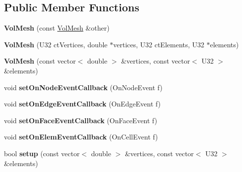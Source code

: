 \subsection*{Public Member Functions}
\begin{DoxyCompactItemize}
\item 
\hypertarget{classps_1_1elastic_1_1VolMesh_ae6c4090f52d629275bafec3b28b82a72}{}{\bfseries Vol\+Mesh} (const \hyperlink{classps_1_1elastic_1_1VolMesh}{Vol\+Mesh} \&other)\label{classps_1_1elastic_1_1VolMesh_ae6c4090f52d629275bafec3b28b82a72}

\item 
\hypertarget{classps_1_1elastic_1_1VolMesh_a47f2518a104c2fd21038fd6293c5df4b}{}{\bfseries Vol\+Mesh} (U32 ct\+Vertices, double $\ast$vertices, U32 ct\+Elements, U32 $\ast$elements)\label{classps_1_1elastic_1_1VolMesh_a47f2518a104c2fd21038fd6293c5df4b}

\item 
\hypertarget{classps_1_1elastic_1_1VolMesh_a5d354fc8ecc1cf49eaabf54d47ffaf4f}{}{\bfseries Vol\+Mesh} (const vector$<$ double $>$ \&vertices, const vector$<$ U32 $>$ \&elements)\label{classps_1_1elastic_1_1VolMesh_a5d354fc8ecc1cf49eaabf54d47ffaf4f}

\item 
\hypertarget{classps_1_1elastic_1_1VolMesh_ae7e26e6519d1e2db5d5bbf58cb402906}{}void {\bfseries set\+On\+Node\+Event\+Callback} (On\+Node\+Event f)\label{classps_1_1elastic_1_1VolMesh_ae7e26e6519d1e2db5d5bbf58cb402906}

\item 
\hypertarget{classps_1_1elastic_1_1VolMesh_a38dde82b129ee0361b07162da7f9b60b}{}void {\bfseries set\+On\+Edge\+Event\+Callback} (On\+Edge\+Event f)\label{classps_1_1elastic_1_1VolMesh_a38dde82b129ee0361b07162da7f9b60b}

\item 
\hypertarget{classps_1_1elastic_1_1VolMesh_a96b1b84565c4c6b0224cc4d9ad738c90}{}void {\bfseries set\+On\+Face\+Event\+Callback} (On\+Face\+Event f)\label{classps_1_1elastic_1_1VolMesh_a96b1b84565c4c6b0224cc4d9ad738c90}

\item 
\hypertarget{classps_1_1elastic_1_1VolMesh_a4a72cb08f525cc838b474add44cb253b}{}void {\bfseries set\+On\+Elem\+Event\+Callback} (On\+Cell\+Event f)\label{classps_1_1elastic_1_1VolMesh_a4a72cb08f525cc838b474add44cb253b}

\item 
\hypertarget{classps_1_1elastic_1_1VolMesh_af0f695203df44322ab5d064d5b6f8b7e}{}bool {\bfseries setup} (const vector$<$ double $>$ \&vertices, const vector$<$ U32 $>$ \&elements)\label{classps_1_1elastic_1_1VolMesh_af0f695203df44322ab5d064d5b6f8b7e}


\end{DoxyCompactItemize}
